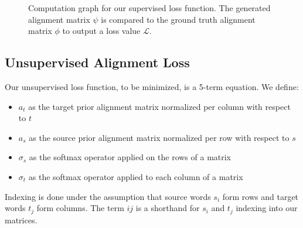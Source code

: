 \documentclass[twoside,twocolumn]{article}
\begin{document}
\begin{figure}
  \centering
  \caption{Computation graph for our supervised loss function. The generated alignment matrix $\psi$ is compared to the ground truth alignment matrix $\phi$ to output a loss value $\mathcal{L}$.}
  \label{fig:supervised_loss}
\end{figure}

\subsection{Unsupervised Alignment Loss}


Our unsupervised loss function, to be minimized, is a 5-term equation. We define:
\begin{itemize}[label={}]
  \item $a_t$ as the target prior alignment matrix normalized per column with respect to $t$\\ %
  \item $a_s$ as the source prior alignment matrix normalized per row with respect to $s$\\ %
  \item $\sigma_s$ as the softmax operator applied on the rows of a matrix\\
  \item $\sigma_t$ as the softmax operator applied to each column of a matrix
\end{itemize}

Indexing is done under the assumption that source words $s_i$ form rows
and target words $t_j$ form columns. The term $ij$ is a shorthand
for $s_i$ and $t_j$ indexing into our matrices.
\end{document}
